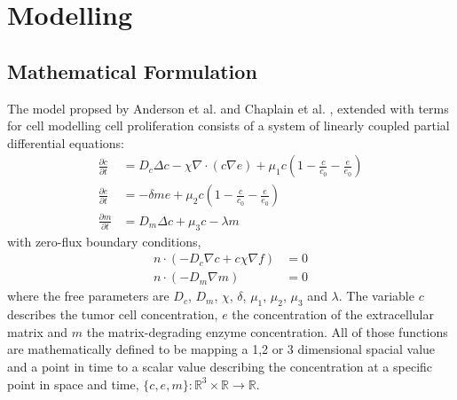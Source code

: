 \section{Modelling}

\subsection{Mathematical Formulation}

The model propsed by Anderson et al. \cite{anderson_continuous_1998,anderson_mathematical_2000} 
and Chaplain et al. \cite{anderson_continuous_1998,chaplain_mathematical_2006,chaplain_mathematical_2006-1,franssen_mathematical_2019}, extended with terms for cell modelling cell proliferation consists of a system of linearly coupled partial differential equations: 
\begin{align*}
	\frac{\partial c}{\partial t} &= D_c \Delta c - \chi \nabla \cdot (c\nabla e)  + \mu_1 c\left(1-\frac{c}{c_0}-\frac{e}{e_0}\right)
    \\
	\frac{\partial e}{\partial t} &= -\delta m e  + \mu_2 c\left(1-\frac{c}{c_0}-\frac{e}{e_0}\right)\\
	\frac{\partial m}{\partial t} &= D_m \Delta c + \mu_3 c - \lambda m
\end{align*}
with zero-flux boundary conditions, 
\begin{align*}
	n\cdot (-D_c \nabla c + c \chi\nabla f) &= 0 \\
	n \cdot (-D_m\nabla m ) &= 0
\end{align*}
where the free parameters are $D_c$, $D_m$, $\chi$, $\delta$, $\mu_1$, $\mu_2$, $\mu_3$ and $\lambda$. \newline
The variable $c$ describes the tumor cell concentration, $e$ the concentration of the extracellular matrix and $m$ the matrix-degrading enzyme concentration. All of those functions are mathematically defined to be mapping a 1,2 or 3 dimensional spacial value and a point in time to a scalar value describing the concentration at a specific point in space and time, $\{c,e,m\} : \mathbb{R}^{3} \times \mathbb{R} \rightarrow \mathbb{R}$.\newline

